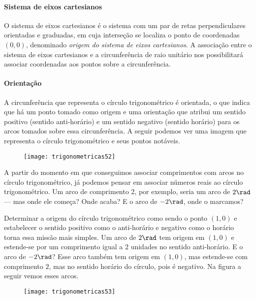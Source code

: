 \paragraph{Sistema de eixos cartesianos}

O sistema de eixos cartesianos é o sistema com um par de retas perpendiculares orientadas e graduadas, em cuja interseção se localiza o ponto de coordenadas $(0,0)$, denominado \textit{origem do sistema de eixos cartesianos}. A associação entre o sistema de eixos cartesianos e a circunferência de raio unitário nos possibilitará associar coordenadas aos pontos sobre a circunferência.

\paragraph{Orientação}

A circunferência que representa o círculo trigonométrico é orientada, o que indica que há um ponto tomado como origem e uma orientação que atribui um sentido positivo (sentido anti-horário) e um sentido negativo (sentido horário) para os arcos tomados sobre essa circunferência. A seguir podemos ver uma imagem que representa o círculo trigonométrico e seus pontos notáveis.

\begin{figure}[H]
\centering

\texttt{[image: trigonometricas52]}
\end{figure}

A partir do momento em que conseguimos associar comprimentos com arcos no círculo trigonométrico, já podemos pensar em associar números reais ao círculo trigonométrico. Um arco de comprimento 2, por exemplo, seria um arco de $2 \rad$ --- mas onde ele começa? Onde acaba? E o arco de $-2\rad$, onde o marcamos?

Determinar a origem do círculo trigonométrico como sendo o ponto $(1,0)$ e estabelecer o sentido positivo como o anti-horário e negativo como o horário torna essa missão mais simples. Um arco de $2\rad$ tem origem em $(1,0)$ e estende-se por um comprimento igual a $2$ unidades no sentido anti-horário. E o arco de $-2 \rad$? Esse arco também tem origem em $(1,0)$, mas estende-se com comprimento $2$, mas no sentido horário do círculo, pois é negativo. Na figura a seguir vemos esses arcos.

\begin{figure}[H]
\centering

\texttt{[image: trigonometricas53]}
\end{figure}

